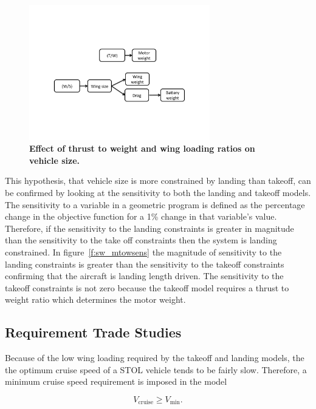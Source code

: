 \documentclass[]{aiaa-tc}%
\begin{document}
\begin{figure}[h!]
	\begin{center}
	\includegraphics[width=0.7\textwidth]{to_land_arg.pdf}
    \caption{\textbf{Effect of thrust to weight and wing loading ratios on vehicle size.}}
	\label{f:to_land_arg}
	\end{center}
\end{figure}

This hypothesis, that vehicle size is more constrained by landing than takeoff, can be confirmed by looking at the sensitivity to both the landing and takeoff models. 
The sensitivity to a variable in a geometric program is defined as the percentage change in the objective function for a 1\% change in that variable's value.  
Therefore, if the sensitivity to the landing constraints is greater in magnitude than the sensitivity to the take off constraints then the system is landing constrained.  
In figure~\ref{f:sw_mtowsens} the magnitude of sensitivity to the landing constraints is greater than the sensitivity to the takeoff constraints confirming that the aircraft is landing length driven. 
The sensitivity to the takeoff constraints is not zero because the takeoff model requires a thrust to weight ratio which determines the motor weight. 


\subsection{Requirement Trade Studies}

Because of the low wing loading required by the takeoff and landing models, the the optimum cruise speed of a STOL vehicle tends to be fairly slow.
Therefore, a minimum cruise speed requirement is imposed in the model

\begin{equation}
    V_{\mathrm{cruise}} \geq V_{\mathrm{min}}.
\end{equation}
\end{document}

